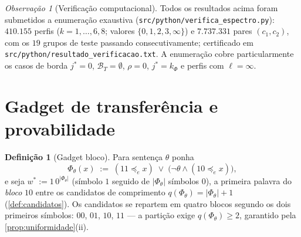 \documentclass[11pt,a4paper]{article}
\theoremstyle{definition}
\newtheorem{definition}[theorem]{Definição}
\theoremstyle{remark}
\newtheorem*{remark}{Observação}
\begin{document}
\begin{remark}[Verifica\c{c}\~{a}o computacional]\label{obs:verificacao}
Todos os resultados acima foram submetidos a enumeração exaustiva
(\texttt{src/python/verifica\_espectro.py}): $410.155$ perfis
($k = 1,\dots,6,8$; valores $\{0,1,2,3,\infty\}$) e $7.737.331$ pares
$(c_1, c_2)$, com os $19$ grupos de teste passando consecutivamente; certificado
em \texttt{src/python/resultado\_verificacao.txt}. A enumeração cobre
particularmente os casos de borda $j^{*} = 0$, $\mathcal{B}_T = \emptyset$,
$\rho = 0$, $j^{*} = k_\Phi$ e perfis com $\ell = \infty$.
\end{remark}

\section{Gadget de transfer\^{e}ncia e provabilidade}\label{sec:gadget}


\begin{definition}[Gadget bloco]\label{def:gadget}
Para sentença $\theta$ ponha
\begin{equation}\label{eq:gadget}
  \Phi_\theta(x) \;:=\; (11 \preceq_{e} x) \;\vee\;
  \bigl(\neg\theta \wedge (10 \preceq_{e} x)\bigr),
\end{equation}
e seja $w^{*} := 1\,0^{\lvert\Phi_\theta\rvert}$ (símbolo $1$ seguido de
$\lvert\Phi_\theta\rvert$ símbolos $0$), a primeira palavra do \emph{bloco}
$10$ entre os candidatos de comprimento
$q(\Phi_\theta) = \lvert\Phi_\theta\rvert + 1$ (\cref{def:candidatos}).
Os candidatos se repartem em quatro blocos segundo os dois primeiros símbolos:
$00$, $01$, $10$, $11$ --- a partição exige $q(\Phi_\theta) \geq 2$, garantido
pela \cref{prop:uniformidade}(ii).
\end{definition}
\end{document}

